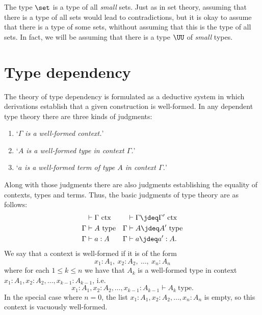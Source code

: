 The type $\set$ is a type of all \emph{small} sets.
Just as in set theory, assuming that there is a type of all sets would lead to contradictions, but it is okay to assume that there is a type of some sets, whithout assuming that this is the type of all sets.
In fact, we will be assuming that there is a type $\UU$ of \emph{small} types.

\section{Type dependency}

The theory of type dependency is formulated as a deductive system in which derivations establish that a given construction is well-formed. In any dependent type theory there are three kinds of judgments:
\begin{enumerate}
\item `\emph{$\Gamma$ is a well-formed context.}'
\item `\emph{$A$ is a well-formed type in context $\Gamma$.}'
\item `\emph{$a$ is a well-formed term of type $A$ in context $\Gamma$.}'
\end{enumerate}
Along with those judgments there are also judgments establishing the equality of contexts, types and terms.
Thus, the basic judgments of type theory are as follows:
\begin{align*}
& \vdash \Gamma~\mathrm{ctx} & & \vdash \Gamma\jdeq \Gamma'~\mathrm{ctx} \\
\Gamma & \vdash A~\mathrm{type} & \Gamma & \vdash A\jdeq A'~\mathrm{type}\\
\Gamma & \vdash a:A & \Gamma & \vdash a\jdeq a':A.
\end{align*}
We say that a context is well-formed if it is of the form
\begin{equation*}
x_1:A_1,~x_2:A_2,~\ldots,~x_n:A_n
\end{equation*}
where for each $1\leq k\leq n$ we have that $A_k$ is a well-formed type in context $x_1:A_1,x_2:A_2,\ldots,x_{k-1}:A_{k-1}$, i.e.
\begin{equation*}
x_1:A_1,x_2:A_2,\ldots,x_{k-1}:A_{k-1} \vdash A_k~\mathrm{type}.
\end{equation*}
In the special case where $n=0$, the list $x_1:A_1,x_2:A_2,\ldots,x_n:A_n$ is empty, so this context is vacuously well-formed.

